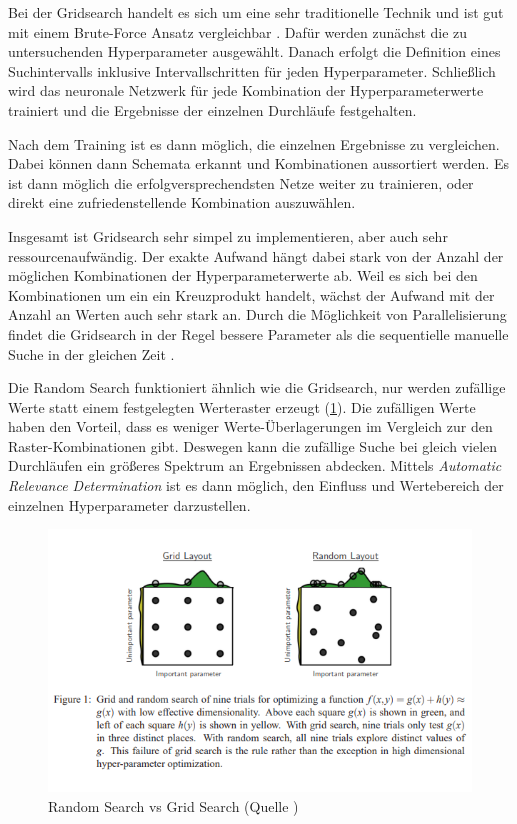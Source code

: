 Bei der Gridsearch handelt es sich um eine sehr traditionelle Technik und ist gut mit einem Brute-Force Ansatz vergleichbar \cite{hyperparameters-grid-search}.
Dafür werden zunächst die zu untersuchenden Hyperparameter ausgewählt.
Danach erfolgt die Definition eines Suchintervalls inklusive Intervallschritten für jeden Hyperparameter.
Schließlich wird das neuronale Netzwerk für jede Kombination der Hyperparameterwerte trainiert und die Ergebnisse der einzelnen Durchläufe festgehalten.
\newline

Nach dem Training ist es dann möglich, die einzelnen Ergebnisse zu vergleichen.
Dabei können dann Schemata erkannt und Kombinationen aussortiert werden.
Es ist dann möglich die erfolgversprechendsten Netze weiter zu trainieren, oder direkt eine zufriedenstellende Kombination auszuwählen.
\newline

Insgesamt ist Gridsearch sehr simpel zu implementieren, aber auch sehr ressourcenaufwändig.
Der exakte Aufwand hängt dabei stark von der Anzahl der möglichen Kombinationen der Hyperparameterwerte ab.
Weil es sich bei den Kombinationen um ein ein Kreuzprodukt handelt, wächst der Aufwand mit der Anzahl an Werten auch sehr stark an.
Durch die Möglichkeit von Parallelisierung findet die Gridsearch in der Regel bessere Parameter als die sequentielle manuelle Suche in der gleichen Zeit \cite{hyperparameters-random-search}.

Die Random Search \cite{hyperparameters-random-search} funktioniert ähnlich wie die Gridsearch, nur werden zufällige Werte statt einem festgelegten Werteraster erzeugt (\cref{img:random-search}).
Die zufälligen Werte haben den Vorteil, dass es weniger Werte-Überlagerungen im Vergleich zur den Raster-Kombinationen gibt.
Deswegen kann die zufällige Suche bei gleich vielen Durchläufen ein größeres Spektrum an Ergebnissen abdecken.
Mittels \textit{Automatic Relevance Determination} \cite{automatic-relevance-determination} ist es dann möglich, den Einfluss und Wertebereich der einzelnen Hyperparameter darzustellen.

\begin{figure}[H]
	\includegraphics{kapitel/2_stand_der_technik/img/random-vs-grid-search.png}
	\caption{Random Search vs Grid Search (Quelle \cite{hyperparameters-random-search})}
	\label{img:random-search}
\end{figure}

